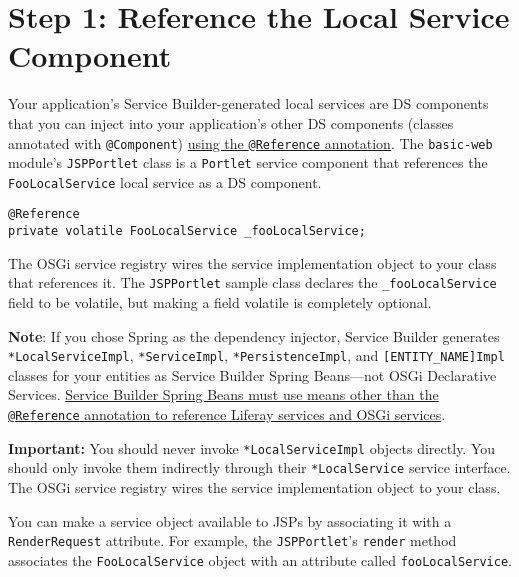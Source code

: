 \section{Step 1: Reference the Local Service
Component}\label{step-1-reference-the-local-service-component}

Your application's Service Builder-generated local services are DS
components that you can inject into your application's other DS
components (classes annotated with \texttt{@Component})
\href{/docs/7-2/frameworks/-/knowledge_base/f/declarative-services}{using
the \texttt{@Reference} annotation}. The \texttt{basic-web} module's
\texttt{JSPPortlet} class is a \texttt{Portlet} service component that
references the \texttt{FooLocalService} local service as a DS component.

\begin{verbatim}
@Reference
private volatile FooLocalService _fooLocalService;
\end{verbatim}

The OSGi service registry wires the service implementation object to
your class that references it. The \texttt{JSPPortlet} sample class
declares the \texttt{\_fooLocalService} field to be volatile, but making
a field volatile is completely optional.

\noindent\hrulefill

\textbf{Note}: If you chose Spring as the dependency injector, Service
Builder generates \texttt{*LocalServiceImpl}, \texttt{*ServiceImpl},
\texttt{*PersistenceImpl}, and \texttt{{[}ENTITY\_NAME{]}Impl} classes
for your entities as Service Builder Spring Beans---not OSGi Declarative
Services.
\href{/docs/7-2/appdev/-/knowledge_base/a/invoking-services-from-spring-service-builder-code}{Service
Builder Spring Beans must use means other than the \texttt{@Reference}
annotation to reference Liferay services and OSGi services}.

\noindent\hrulefill

\textbf{Important:} You should never invoke \texttt{*LocalServiceImpl}
objects directly. You should only invoke them indirectly through their
\texttt{*LocalService} service interface. The OSGi service registry
wires the service implementation object to your class.

You can make a service object available to JSPs by associating it with a
\texttt{RenderRequest} attribute. For example, the \texttt{JSPPortlet}'s
\texttt{render} method associates the \texttt{FooLocalService} object
with an attribute called \texttt{fooLocalService}.

